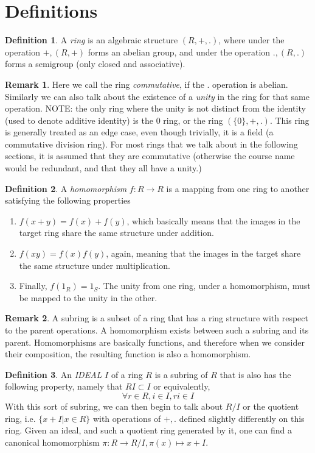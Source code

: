 \documentclass[12pt]{book}
\theoremstyle{definition}
\newtheorem*{definition}{Definition}
\newtheorem*{remark}{Remark}
\begin{document}
\section{Definitions}
\begin{definition}
    A \textit{ring} is an algebraic structure $(R, +, .)$, where under the operation $+, (R, +)$ forms an abelian group, and under the operation $., (R, .)$ forms a semigroup (only closed and associative). 
\end{definition}
\begin{remark}
    Here we call the ring \textit{commutative}, if the $.$ operation is abelian. Similarly we can also talk about the existence of a \textit{unity} in the ring for that same operation. NOTE: the only ring where the unity is not distinct from the identity (used to denote additive identity) is the $0$ ring, or the ring $(\{0\}, + , .)$. This ring is generally treated as an edge case, even though trivially, it is a field (a commutative division ring). For most rings that we talk about in the following sections, it is assumed that they are commutative (otherwise the course name would be redundant, and that they all have a unity.)
\end{remark}
\begin{definition}
    A \textit{homomorphism} $f: R \to R$ is a mapping from one ring to another satisfying the following properties \begin{enumerate}
        \item $f(x + y) = f(x) + f(y)$, which basically means that the images in the target ring share the same structure under addition.
        \item $f(xy) = f(x)f(y)$, again, meaning that the images in the target share the same structure under multiplication.
        \item Finally, $f(1_R) = 1_S$. The unity from one ring, under a homomorphism, must be mapped to the unity in the other.
    \end{enumerate}
\end{definition}
\begin{remark}
    A subring is a subset of a ring that has a ring structure with respect to the parent operations. A homomorphism exists between such a subring and its parent. Homomorphisms are basically functions, and therefore when we consider their composition, the resulting function is also a homomorphism.
\end{remark}
\begin{definition}
    An \textit{IDEAL} $I$ of a ring $R$ is a subring of $R$ that is also has the following property, namely that $RI \subset I$ or equivalently, $$\forall r \in R, i \in I, ri \in I$$ With this sort of subring, we can then begin to talk about $R/I$ or the quotient ring, i.e. $\{ x + I | x \in R \}$ with operations of $+, .$ defined slightly differently on this ring. Given an ideal, and such a quotient ring generated by it, one can find a canonical homomorphism $\pi: R \to R/I, \pi(x) \mapsto x + I$.
\end{definition}
\end{document}

